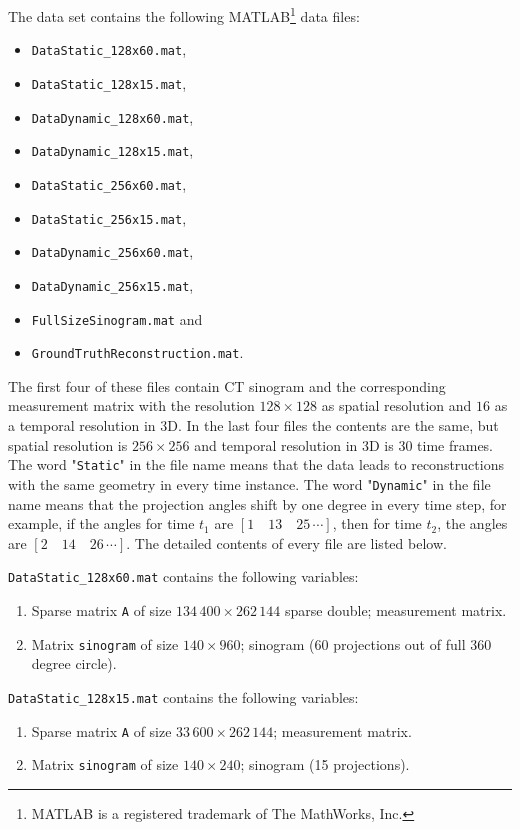 \documentclass[a4paper,12pt]{article}
\begin{document}
{The data set contains the following MATLAB\footnote{MATLAB is a registered trademark of The MathWorks, Inc.} data files:
\begin{itemize}
\item  {\tt DataStatic\_128x60.mat},
\item  {\tt DataStatic\_128x15.mat},
\item  {\tt DataDynamic\_128x60.mat},
\item  {\tt DataDynamic\_128x15.mat},
\item  {\tt DataStatic\_256x60.mat},
\item  {\tt DataStatic\_256x15.mat},
\item  {\tt DataDynamic\_256x60.mat},
\item  {\tt DataDynamic\_256x15.mat},
\item {\tt FullSizeSinogram.mat} and
\item  {\tt GroundTruthReconstruction.mat}.
\end{itemize}
The first four of these files contain CT sinogram and the corresponding measurement matrix with the resolution $128 \times 128$ as spatial resolution and $16$ as a temporal resolution in 3D. In the last four files the contents are the same, but spatial resolution is $256 \times 256$ and temporal resolution in 3D is $30$ time frames. The word "{\tt Static}" in the file name means that the data leads to reconstructions with the same geometry in every time instance.  The word "{\tt Dynamic}" in the file name means that the projection angles shift by one degree in every time step, for example, if the angles for time $t_1$ are $[1\quad13\quad25 \,\cdots]$, then for time $t_2$, the angles are $[2\quad14\quad26 \,\cdots]$. The detailed contents of every file are listed below.


\bigskip\noindent
{\tt DataStatic\_128x60.mat} contains the following variables:
\begin{enumerate}
\item Sparse matrix {\tt A} of size $134\,400\times 262\,144$ sparse double; measurement matrix.
\item Matrix {\tt sinogram} of size $140\times 960$; sinogram (60 projections out of full 360 degree circle).
\end{enumerate}

\bigskip\noindent
{\tt DataStatic\_128x15.mat} contains the following variables:
\begin{enumerate}
\item Sparse matrix {\tt A} of size $33\,600\times 262\,144$; measurement matrix.
\item Matrix {\tt sinogram} of size $140\times 240$; sinogram (15 projections).
\end{enumerate}

}
\end{document}
